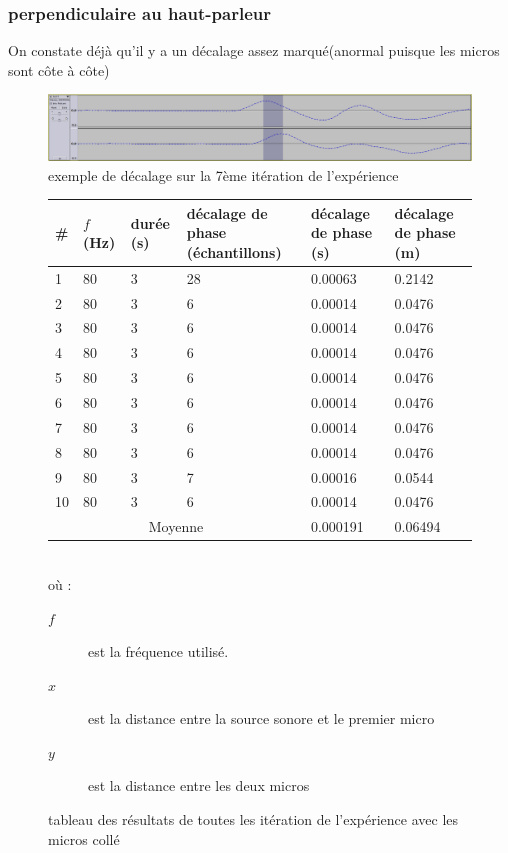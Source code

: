\documentclass[12pt,a4paper]{report}
\begin{document}
\subsubsection{perpendiculaire au haut-parleur}

On constate déjà qu'il y a un décalage assez marqué(anormal puisque les micros sont côte à côte)
\begin{figure}[h]
\includegraphics[width=\textwidth]{../tests/test_du_protocole/mesures_perpendiculaires/test7.png} 
\caption{exemple de décalage sur la 7ème itération de l'expérience}
\end{figure}

\begin{figure}[H]
\begin{center}
\begin{tabular}{|l || p{1.4cm} | p{1.4cm} | p{1.4cm} | p{1.7cm} | p{1.7cm}  |}
\hline
\# & $f$ (Hz) &  durée (s) & décalage de phase (échantillons) & décalage de phase (s) & décalage de phase (m)\\
\hline
\hline
1	&80	&3	&28 &0.00063	&0.2142\\
2	&80	&3	&6	&0.00014	&0.0476\\
3	&80	&3	&6	&0.00014	&0.0476\\
4	&80	&3	&6	&0.00014	&0.0476\\
5	&80	&3	&6	&0.00014	&0.0476\\
6	&80	&3	&6	&0.00014	&0.0476\\
7	&80	&3	&6	&0.00014	&0.0476\\
8	&80	&3	&6	&0.00014	&0.0476\\
9	&80	&3	&7	&0.00016	&0.0544\\
10	&80	&3	&6	&0.00014	&0.0476\\
\hline
\multicolumn{4}{|c|}{Moyenne} & 0.000191	&0.06494\\
\hline

\end{tabular}
\end{center}
~\\
où : 
\begin{description}
\item[$f$] est la fréquence utilisé.
\item[$x$] est la distance entre la source sonore et le premier micro
\item[$y$] est la distance entre les deux micros
\end{description}
\caption{tableau des résultats de toutes les itération de l'expérience avec les micros collé}
\end{figure}
\end{document}
